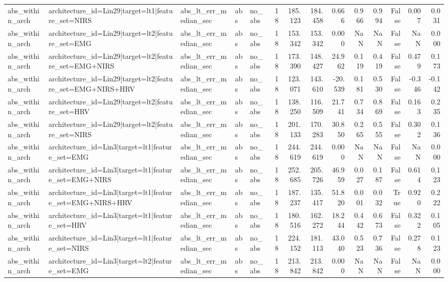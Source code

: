 \begin{table}
\begin{tabular}{lllllrrrrrrrrr}
abs_within_arch & architecture_id=Lin29|target=lt1|feature_set=NIRS & abs_lt_err_median_sec & abs & no_abs & 18 & 185.123 & 184.458 & 0.666 & 0.966 & 0.994 & False & 0.007 & 0.031 \\
abs_within_arch & architecture_id=Lin29|target=lt2|feature_set=EMG & abs_lt_err_median_sec & abs & no_abs & 18 & 153.342 & 153.342 & 0.000 & NaN & NaN & False & NaN & 0.000 \\
abs_within_arch & architecture_id=Lin29|target=lt2|feature_set=EMG+NIRS & abs_lt_err_median_sec & abs & no_abs & 18 & 173.390 & 148.427 & 24.962 & 0.119 & 0.419 & False & 0.479 & 0.173 \\
abs_within_arch & architecture_id=Lin29|target=lt2|feature_set=EMG+NIRS+HRV & abs_lt_err_median_sec & abs & no_abs & 18 & 123.071 & 143.610 & -20.539 & 0.181 & 0.530 & False & -0.346 & -0.142 \\
abs_within_arch & architecture_id=Lin29|target=lt2|feature_set=HRV & abs_lt_err_median_sec & abs & no_abs & 18 & 138.250 & 116.509 & 21.741 & 0.734 & 0.869 & False & 0.163 & 0.235 \\
abs_within_arch & architecture_id=Lin29|target=lt2|feature_set=NIRS & abs_lt_err_median_sec & abs & no_abs & 18 & 201.133 & 170.283 & 30.850 & 0.265 & 0.555 & False & 0.302 & 0.136 \\
abs_within_arch & architecture_id=Lin3|target=lt1|feature_set=EMG & abs_lt_err_median_sec & abs & no_abs & 18 & 244.619 & 244.619 & 0.000 & NaN & NaN & False & NaN & 0.000 \\
abs_within_arch & architecture_id=Lin3|target=lt1|feature_set=EMG+NIRS & abs_lt_err_median_sec & abs & no_abs & 18 & 252.685 & 205.726 & 46.959 & 0.027 & 0.187 & False & 0.614 & 0.123 \\
abs_within_arch & architecture_id=Lin3|target=lt1|feature_set=EMG+NIRS+HRV & abs_lt_err_median_sec & abs & no_abs & 18 & 187.237 & 135.417 & 51.820 & 0.001 & 0.032 & True & 0.920 & 0.222 \\
abs_within_arch & architecture_id=Lin3|target=lt1|feature_set=HRV & abs_lt_err_median_sec & abs & no_abs & 18 & 180.516 & 162.272 & 18.244 & 0.442 & 0.673 & False & 0.322 & 0.105 \\
abs_within_arch & architecture_id=Lin3|target=lt1|feature_set=NIRS & abs_lt_err_median_sec & abs & no_abs & 18 & 224.152 & 181.113 & 43.040 & 0.523 & 0.736 & False & 0.278 & 0.123 \\
abs_within_arch & architecture_id=Lin3|target=lt2|feature_set=EMG & abs_lt_err_median_sec & abs & no_abs & 18 & 213.842 & 213.842 & 0.000 & NaN & NaN & False & NaN & 0.000 \\

\end{tabular}
\end{table}
